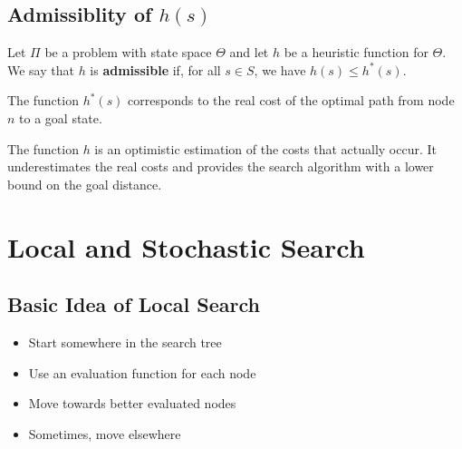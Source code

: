 \documentclass[conference]{styles/acmsiggraph}
\begin{document}
        
    \subsection{Admissiblity of $h(s)$}
        Let $\Pi$ be a problem with state space $\Theta$ and let $h$ be a heuristic function for $\Theta$.
        We say that $h$ is \textbf{admissible} if, for all $s \in S$, we have $h(s) \leq h^*(s)$.\newline
        
        The function $h^*(s)$ corresponds to the real cost of the optimal path from node $n$ to a goal state.\newline
        
        The function $h$ is an optimistic estimation of the costs that actually occur.
        It underestimates the real costs and provides the search algorithm with a lower bound on the goal distance.
        
        
        
        
        
        
        
        
\section{Local and Stochastic Search}
    
    \subsection{Basic Idea of Local Search}
        \begin{itemize}
            \item Start somewhere in the search tree
            \item Use an evaluation function for each node
            \item Move towards better evaluated nodes
            \item Sometimes, move elsewhere
        \end{itemize}
    
    
\end{document}
